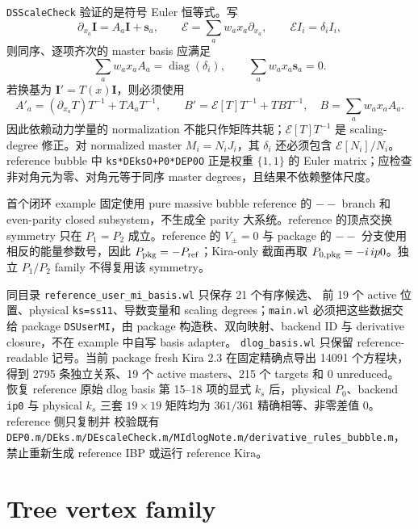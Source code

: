﻿\documentclass[a4paper,11pt]{article}
\begin{document}
\texttt{DSScaleCheck} 验证的是符号 Euler 恒等式。写
\begin{equation}
 \partial_{x_a}\boldsymbol I=A_a\boldsymbol I+\boldsymbol s_a,
 \qquad \mathcal E=\sum_a w_a x_a\partial_{x_a},
 \qquad \mathcal E I_i=\delta_i I_i,
\end{equation}
则同序、逐项齐次的 master basis 应满足
\begin{equation}
 \sum_a w_a x_a A_a=\operatorname{diag}(\delta_i),
 \qquad \sum_a w_a x_a\boldsymbol s_a=0.
\end{equation}
若换基为 $\boldsymbol I'=T(x)\boldsymbol I$，则必须使用
\begin{equation}
 A'_a=(\partial_{x_a}T)T^{-1}+T A_aT^{-1},\qquad
 B'=\mathcal E[T]T^{-1}+TBT^{-1},
 \quad B=\sum_a w_a x_aA_a.
\end{equation}
因此依赖动力学量的 normalization 不能只作矩阵共轭；$\mathcal E[T]T^{-1}$ 是 scaling-degree
修正。对 normalized master $M_i=N_iJ_i$，其 $\delta_i$ 还必须包含
$\mathcal E[N_i]/N_i$。reference bubble 中 \texttt{ks*DEksO+P0*DEP0O} 正是权重
$\{1,1\}$ 的 Euler matrix；应检查非对角元为零、对角元等于同序 master degrees，且结果不依赖整体尺度。

首个闭环 example 固定使用 pure massive bubble reference 的 $--$ branch 和 even-parity closed subsystem，不生成全 parity 大系统。reference 的顶点交换 symmetry 只在 $P_1=P_2$ 成立。reference 的 $V_{\pm}=0$ 与 package 的 $--$ 分支使用相反的能量参数号，因此 $P_{\rm pkg}=-P_{\rm ref}$；Kira-only 截面再取 $P_{0,\rm pkg}=-i\,ip0$。独立 $P_1/P_2$ family 不得复用该 symmetry。

同目录 \texttt{reference\_user\_mi\_basis.wl} 只保存 21 个有序候选、
前 19 个 active 位置、physical \texttt{ks=ss11}、导数变量和 scaling degrees；\texttt{main.wl} 必须把这些数据交给 package \texttt{DSUserMI}，由 package 构造秩、双向映射、backend ID 与 derivative closure，不在 example 中自写 basis adapter。
\texttt{dlog\_basis.wl} 只保留 reference-readable 记号。当前 package fresh Kira 2.3 在固定精确点导出
14091 个方程块，得到 2795 条独立关系、19 个 active masters、215 个 targets 和 0 unreduced。
恢复 reference 原始 dlog basis 第 15--18 项的显式 $k_s$ 后，physical $P_0$、backend \texttt{ip0}
与 physical $k_s$ 三套 $19\times19$ 矩阵均为 $361/361$ 精确相等、非零差值 0。reference 侧只复制并
校验既有 \texttt{DEP0.m/DEks.m/DEscaleCheck.m/MIdlogNote.m/derivative\_rules\_bubble.m}，禁止重新生成
reference IBP 或运行 reference Kira。

\section{Tree vertex family}
\end{document}
